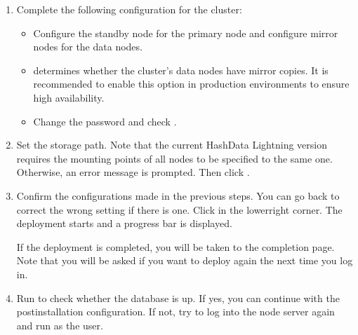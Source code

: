 \documentclass[letterpaper,10pt,english]{sphinxmanual}
\begin{document}
\begin{enumerate}
\item {} 
\sphinxAtStartPar
Complete the following configuration for the cluster:
\begin{itemize}
\item {} 
\sphinxAtStartPar
Configure the standby node for the primary node and configure mirror nodes for the data nodes.

\item {} 
\sphinxAtStartPar
{} determines whether the cluster’s data nodes have mirror copies. It is recommended to enable this option in production environments to ensure high availability.

\item {} 
\sphinxAtStartPar
Change the  password and check .

\end{itemize}

\noindent{}

\item {} 
\sphinxAtStartPar
Set the storage path. Note that the current HashData Lightning version requires the mounting points of all nodes to be specified to the same one. Otherwise, an error message is prompted. Then click .

\item {} 
\sphinxAtStartPar
Confirm the configurations made in the previous steps. You can go back to correct the wrong setting if there is one. Click  in the lower\sphinxhyphen{}right corner. The deployment starts and a progress bar is displayed.

\sphinxAtStartPar
If the deployment is completed, you will be taken to the completion page. Note that you will be asked if you want to deploy again the next time you log in.

\item {} 
\sphinxAtStartPar
Run  to check whether the database is up. If yes, you can continue with the post\sphinxhyphen{}installation configuration. If not, try to log into the node server again and run  as the  user.

\end{enumerate}
\end{document}
